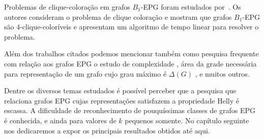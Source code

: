  Problemas de clique-coloração em grafos $B_1$-EPG foram estudados por~\cite{bonomo2017clique}. Os autores consideram o problema de clique coloração e mostram que grafos $B_1$-EPG são 4-clique-coloríveis e apresentam um algoritmo de tempo linear para resolver o problema.

Além dos trabalhos citados podemos mencionar também como pesquisa frequente com relação aos grafos EPG o estudo de complexidade \cite{daniel2014b, martin2017}, área da grade necessária para representação de um grafo cujo grau máximo é $\Delta(G)$ \cite{Asinowski2009}, e muitos outros.

Dentre os diversos temas estudados é possível perceber que a pesquisa que relaciona grafos EPG cujas representações satisfazem a propriedade Helly é escassa.
A dificuldade de reconhecimento de pouquíssimas classes de grafos EPG é conhecida, e ainda para valores de $k$ pequenos somente.  %
 No capítulo seguinte nos dedicaremos a expor os principais resultados obtidos até aqui.

